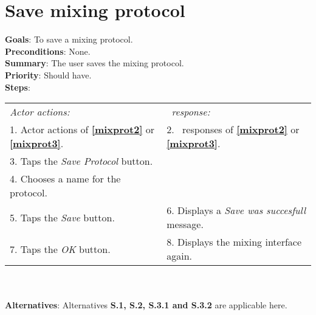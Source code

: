   \section{Save mixing protocol}
  \label{saveprot}
  \textbf{Goals}: To save a mixing protocol.\\
  \textbf{Preconditions}: None. \\
  \textbf{Summary}: The user saves the mixing protocol.\\
  \textbf{Priority}: Should have.\\
  \textbf{Steps}: \\
  \begin{tabular}{ p{} p{} }
  	\emph{Actor actions:} & \emph{\projectname\ response:} \\
  	1. Actor actions of \textbf{\ref{mixprot2}} or \textbf{\ref{mixprot3}}. & 2. \projectname\ responses of \textbf{\ref{mixprot2}} or \textbf{\ref{mixprot3}}. \\
    3. Taps the \emph{Save Protocol} button.  & \\
    4. Chooses a name for the protocol. & \\
    5. Taps the \emph{Save} button. & 6. Displays a \emph{Save was succesfull} message.\\
    7. Taps the \emph{OK} button. & 8. Displays the mixing interface again. \\
      \end{tabular}
    	 \\
    \\\textbf{Alternatives}: Alternatives \textbf{S.1, S.2, S.3.1 and S.3.2} are applicable here.
    
